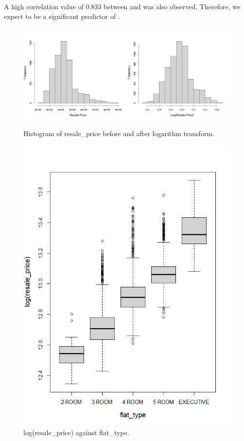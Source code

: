 A high correlation value of 0.833 between  and  was also observed. Therefore, we expect  to be a significant predictor of .

\begin{figure}
\centering
\begin{minipage}[t]{0.75\textwidth}
    \centering
    \includegraphics[width=\textwidth]{images/Screenshot 2023-04-11 175624.png}
    \caption{Histogram of resale\_price before and after logarithm transform.}
    \label{fig:histogram_transform}
\end{minipage}\hfill
\begin{minipage}[t]{0.24\textwidth}
  \centering
  \includegraphics[width=\textwidth]{images2/logresaleprice against flattype.png}
  \caption{log(resale\_price) against flat\_type.}
  \label{fig: boxplot}
\end{minipage}
\end{figure}


